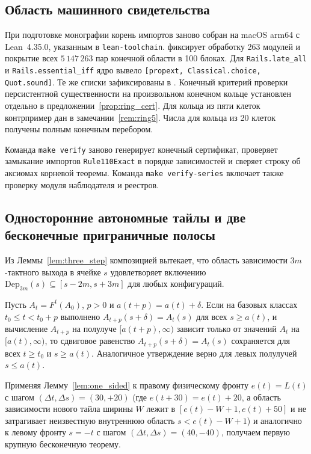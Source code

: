 \subsection{Область машинного свидетельства}
При подготовке монографии корень импортов заново собран на macOS arm64 с Lean~4.35.0, указанным в \texttt{lean-toolchain}.  фиксирует обработку 263 модулей и покрытие всех $5\,147\,263$ пар конечной области в 100 блоках. Для \texttt{Rails.late\_all} и \texttt{Rails.essential\_iff} ядро вывело \texttt{[propext, Classical.choice, Quot.sound]}. Те же списки зафиксированы в . Конечный критерий проверки персистентной существенности на произвольном конечном кольце установлен отдельно в предложении~\ref{prop:ring_cert}. Для кольца из пяти клеток контрпример дан в замечании~\ref{rem:ring5}. Числа для кольца из 20 клеток получены полным конечным перебором.

Команда \texttt{make verify} заново генерирует конечный сертификат, проверяет замыкание импортов \texttt{Rule110Exact} в порядке зависимостей и сверяет строку об аксиомах корневой теоремы. Команда \texttt{make verify-series} включает также проверку модуля наблюдателя и реестров.

\subsection{Односторонние автономные тайлы и две бесконечные приграничные полосы}\label{app:half-ray-tiles}

Из Леммы~\ref{lem:three_step} композицией вытекает, что область зависимости $3m$-тактного выхода в ячейке $s$ удовлетворяет включению $\mathrm{Dep}_{3m}(s) \subseteq [s - 2m, s + 3m]$ для любых конфигураций.

\begin{lemma}\label{lem:one_sided}
Пусть $A_t = F^t(A_0)$, $p > 0$ и $a(t + p) = a(t) + \delta$. Если на базовых классах $t_0 \le t < t_0 + p$ выполнено $A_{t+p}(s + \delta) = A_t(s)$ для всех $s \ge a(t)$, и вычисление $A_{t+p}$ на полулуче $[a(t+p), \infty)$ зависит только от значений $A_t$ на $[a(t), \infty)$, то сдвиговое равенство $A_{t+p}(s + \delta) = A_t(s)$ сохраняется для всех $t \ge t_0$ и $s \ge a(t)$. Аналогичное утверждение верно для левых полулучей $s \le a(t)$.
\end{lemma}

Применяя Лемму~\ref{lem:one_sided} к правому физическому фронту $e(t) = L(t)$ с шагом $(\Delta t, \Delta s) = (30, +20)$ (где $e(t+30) = e(t) + 20$, а область зависимости нового тайла ширины $W$ лежит в $[e(t) - W + 1, e(t) + 50]$ и не затрагивает неизвестную внутреннюю область $s < e(t) - W + 1$) и аналогично к левому фронту $s = -t$ с шагом $(\Delta t, \Delta s) = (40,-40)$, получаем первую крупную бесконечную теорему.

